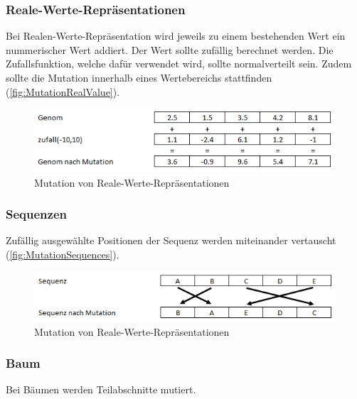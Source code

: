       \subsubsection{Reale-Werte-Repräsentationen}

        Bei Realen-Werte-Repräsentation wird jeweils zu einem bestehenden Wert ein nummerischer Wert addiert.
        Der Wert sollte zufällig berechnet werden.
        Die Zufallsfunktion, welche dafür verwendet wird, sollte normalverteilt sein.
        Zudem sollte die Mutation innerhalb eines Wertebereichs stattfinden (\vref{fig:MutationRealValue}).

        \begin{figure}[H]
          \includegraphics[scale=1,center]{graphics/mutation_real_value}
          \caption{Mutation von Reale-Werte-Repräsentationen\label{fig:MutationRealValue}}
        \end{figure}

      \subsubsection{Sequenzen}

        Zufällig ausgewählte Positionen der Sequenz werden miteinander vertauscht (\vref{fig:MutationSequences}).

        \begin{figure}[H]
            \includegraphics[scale=1,center]{graphics/mutation_sequences}
            \caption{Mutation von Reale-Werte-Repräsentationen\label{fig:MutationSequences}}
        \end{figure}

      \subsubsection{Baum}

        Bei Bäumen werden Teilabschnitte mutiert.

